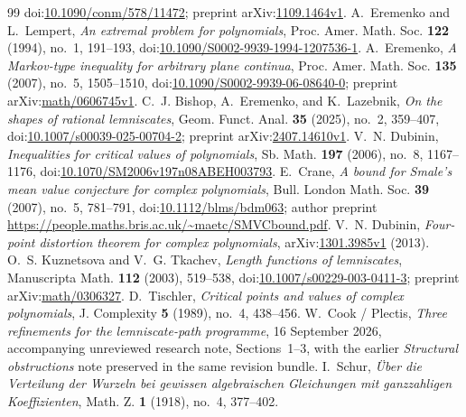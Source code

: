 \begin{thebibliography}{99}
  doi:\href{https://doi.org/10.1090/conm/578/11472}{10.1090/conm/578/11472};
  preprint arXiv:\href{https://arxiv.org/abs/1109.1464v1}{1109.1464v1}.
 A.~Eremenko and L.~Lempert,
  \emph{An extremal problem for polynomials}, Proc. Amer. Math. Soc.
  \textbf{122} (1994), no.~1, 191--193,
  doi:\href{https://doi.org/10.1090/S0002-9939-1994-1207536-1}
  {10.1090/S0002-9939-1994-1207536-1}.
 A.~Eremenko,
  \emph{A Markov-type inequality for arbitrary plane continua},
  Proc. Amer. Math. Soc. \textbf{135} (2007), no.~5, 1505--1510,
  doi:\href{https://doi.org/10.1090/S0002-9939-06-08640-0}
  {10.1090/S0002-9939-06-08640-0};
  preprint arXiv:\href{https://arxiv.org/abs/math/0606745v1}{math/0606745v1}.
 C.~J. Bishop, A.~Eremenko, and
  K.~Lazebnik, \emph{On the shapes of rational lemniscates}, Geom. Funct.
  Anal. \textbf{35} (2025), no.~2, 359--407,
  doi:\href{https://doi.org/10.1007/s00039-025-00704-2}
  {10.1007/s00039-025-00704-2};
  preprint arXiv:\href{https://arxiv.org/abs/2407.14610v1}{2407.14610v1}.
 V.~N. Dubinin,
  \emph{Inequalities for critical values of polynomials}, Sb. Math.
  \textbf{197} (2006), no.~8, 1167--1176,
  doi:\href{https://doi.org/10.1070/SM2006v197n08ABEH003793}{10.1070/SM2006v197n08ABEH003793}.
 E.~Crane,
  \emph{A bound for Smale's mean value conjecture for complex polynomials},
  Bull. London Math. Soc. \textbf{39} (2007), no.~5, 781--791,
  doi:\href{https://doi.org/10.1112/blms/bdm063}{10.1112/blms/bdm063};
  author preprint \url{https://people.maths.bris.ac.uk/~maetc/SMVCbound.pdf}.
 V.~N. Dubinin,
  \emph{Four-point distortion theorem for complex polynomials},
  arXiv:\href{https://arxiv.org/abs/1301.3985v1}{1301.3985v1} (2013).
 O.~S. Kuznetsova and V.~G. Tkachev,
  \emph{Length functions of lemniscates}, Manuscripta Math.
  \textbf{112} (2003), 519--538,
  doi:\href{https://doi.org/10.1007/s00229-003-0411-3}{10.1007/s00229-003-0411-3};
  preprint arXiv:\href{https://arxiv.org/abs/math/0306327}{math/0306327}.
 D.~Tischler,
  \emph{Critical points and values of complex polynomials},
  J. Complexity \textbf{5} (1989), no.~4, 438--456.
 W.~Cook / Plectis,
  \emph{Three refinements for the lemniscate-path programme}, 16 September 2026,
  accompanying unreviewed research note, Sections~1--3, with the earlier
  \emph{Structural obstructions} note preserved in the same revision bundle.
 I.~Schur,
  \emph{\"Uber die Verteilung der Wurzeln bei gewissen algebraischen
  Gleichungen mit ganzzahligen Koeffizienten}, Math. Z. \textbf{1}
  (1918), no.~4, 377--402.
\end{thebibliography}


